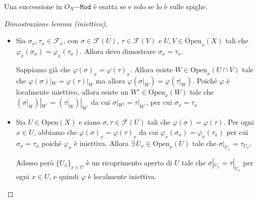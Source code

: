 \begin{remark}{}
    Una successione in \(O_X\mathtt{-Mod}\) è esatta se e solo se lo è sulle
    spighe.
\end{remark}

\begin{proof}[Dimostrazione lemma (\emph{iniettivo})] \( \) 
    \begin{itemize}
        \item[\(\implies \)] Sia \(\sigma_x, \tau_x \in \mathcal{F}_x\), con
            \(\sigma \in \mathcal{F}{(U)}\), \(\tau \in \mathcal{F}{(V)}\) e
            \(U, V \in \mathrm{Open}_x{(X)}\) tali che \(\varphi_x{(\sigma_x)} =
            \varphi _x{(\tau_x)}\). Allora devo dimostrare \(\sigma_x =
            \tau_x\).

            Sappiamo già che \(\varphi {(\sigma)}_x = \varphi {(\tau)}_x\).
            Allora esiste \(W \in \mathrm{Open}_x{(U \cap V)}\) tale che
            \(\varphi {(\sigma)}|_W = \varphi {(\tau)}|_W\) ma allora \(\varphi
            {(\sigma |_W)} = \varphi {(\tau|_W)}\). Poiché \(\varphi \) è
            localmente iniettivo, allora esiste un \(W' \in
            \mathrm{Open}_x{(W)}\) tale che \({(\sigma|_W)}|_{W^{\prime}} =
        {(\tau|_W)}|_{W^{\prime}} \) da cui \(\sigma |_{W'} = \tau|_{W^{\prime}}
        \), per cui \(\sigma_x = \tau_x\) 
        \item[\(\impliedby \)] Sia \(U \in \mathrm{Open}{(X)}\) e siano
            \(\sigma, \tau \in \mathcal{F}{(U)}\) tali che \(\varphi {(\sigma)} =
            \varphi {(\tau)}\). Per ogni \(x \in U\), abbiamo che \(\varphi
            {(\sigma)}_x = \varphi {(\tau)}_x\)  da cui \(\varphi _x{(\sigma_x)}
            = \varphi _x{(\tau_x)}\) per cui \(\sigma_x = \tau_x\) poiché
            \(\varphi _x\) è iniettiva. Allora \(\exists \, U_x \in
            \mathrm{Open}_x{(U)}\) tale che \(\sigma|_{U_x}  = \tau_{U_x}\).

            Adesso però \(\{U_x\}_{x \in U}  \) è un ricoprimento aperto di
            \(U\) tale che \(\sigma|_{U_x} = \tau|_{U_x} \) per ogni \(x \in
            U\), e quindi \(\varphi \) è localmente iniettiva.
    \end{itemize}
\end{proof}

